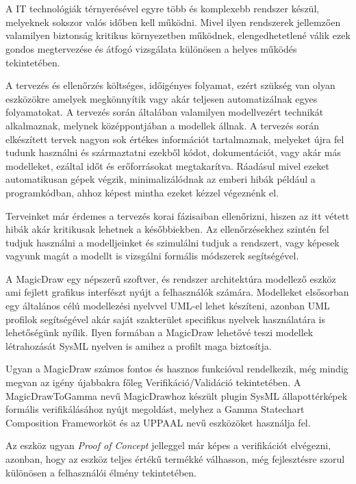 \chapter{\bevezetes}

A IT technológiák térnyerésével egyre több és komplexebb rendszer készül, melyeknek sokszor valós időben kell működni. Mivel ilyen rendszerek jellemzően valamilyen biztonság kritikus környezetben működnek, elengedhetetlené válik ezek gondos megtervezése és átfogó vizsgálata különösen a helyes működés tekintetében.

A tervezés és ellenőrzés költséges, időigényes folyamat, ezért szükség van olyan eszközökre amelyek megkönnyítik vagy akár teljesen automatizálnak egyes folyamatokat. A tervezés során általában valamilyen modellvezért technikát alkalmaznak, melynek középpontjában a modellek állnak. A tervezés során elkészített tervek nagyon sok értékes információt tartalmaznak, melyeket újra fel tudunk használni és származtatni ezekből kódot, dokumentációt, vagy akár más modelleket, ezáltal időt és erőforrásokat megtakarítva. Ráadásul mivel ezeket automatikusan gépek végzik, minimalizálódnak az emberi hibák például a programkódban, ahhoz képest mintha ezeket kézzel végeznénk el.

Terveinket már érdemes a tervezés korai fázisaiban ellenőrizni, hiszen az itt vétett hibák akár kritikusak lehetnek a későbbiekben. Az ellenőrzésekhez szintén fel tudjuk használni a modelljeinket és szimulálni tudjuk a rendszert, vagy képesek vagyunk magát a modellt is vizsgálni formális módszerek segítségével.

A MagicDraw egy népszerű szoftver, és rendszer architektúra modellező eszköz ami fejlett grafikus interfészt nyújt a felhasználók számára. Modelleket elsősorban egy általános célú modellezési nyelvvel UML-el lehet készíteni, azonban UML profilok segítségével akár saját szakterület specifikus nyelvek használatára is lehetőségünk nyílik. Ilyen formában a MagicDraw lehetővé teszi modellek létrahozását SysML nyelven is amihez a profilt maga biztosítja.

Ugyan a MagicDraw számos fontos és hasznos funkcióval rendelkezik, még mindig megvan az igény újabbakra főleg Verifikáció/Validáció tekintetében. A MagicDrawToGamma nevű MagicDrawhoz készült plugin SysML állapottérképek formális verifikálásához nyújt megoldást, melyhez a Gamma Statechart Composition Frameworköt és az UPPAAL nevű eszközöket használja fel.

Az eszköz ugyan \emph{Proof of Concept} jelleggel már képes a verifikációt elvégezni, azonban, hogy az eszköz teljes értékű termékké válhasson, még fejlesztésre szorul különösen a felhasználói élmény tekintetében.

